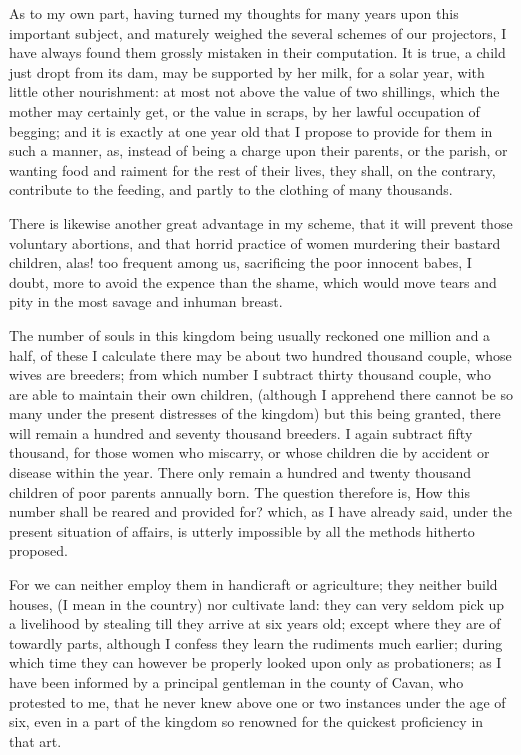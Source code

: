 As to my own part, having turned my thoughts for many years upon this important subject, and maturely weighed the several schemes of our projectors, I have always found them grossly mistaken in their computation. It is true, a child just dropt from its dam, may be supported by her milk, for a solar year, with little other nourishment: at most not above the value of two shillings, which the mother may certainly get, or the value in scraps, by her lawful occupation of begging; and it is exactly at one year old that I propose to provide for them in such a manner, as, instead of being a charge upon their parents, or the parish, or wanting food and raiment for the rest of their lives, they shall, on the contrary, contribute to the feeding, and partly to the clothing of many thousands.\par

There is likewise another great advantage in my scheme, that it will prevent those voluntary abortions, and that horrid practice of women murdering their bastard children, alas! too frequent among us, sacrificing the poor innocent babes, I doubt, more to avoid the expence than the shame, which would move tears and pity in the most savage and inhuman breast.\par

The number of souls in this kingdom being usually reckoned one million and a half, of these I calculate there may be about two hundred thousand couple, whose wives are breeders; from which number I subtract thirty thousand couple, who are able to maintain their own children, (although I apprehend there cannot be so many under the present distresses of the kingdom) but this being granted, there will remain a hundred and seventy thousand breeders. I again subtract fifty thousand, for those women who miscarry, or whose children die by accident or disease within the year. There only remain a hundred and twenty thousand children of poor parents annually born. The question therefore is, How this number shall be reared and provided for? which, as I have already said, under the present situation of affairs, is utterly impossible by all the methods hitherto proposed.\par

For we can neither employ them in handicraft or agriculture; they neither build houses, (I mean in the country) nor cultivate land: they can very seldom pick up a livelihood by stealing till they arrive at six years old; except where they are of towardly parts, although I confess they learn the rudiments much earlier; during which time they can however be properly looked upon only as probationers; as I have been informed by a principal gentleman in the county of Cavan, who protested to me, that he never knew above one or two instances under the age of six, even in a part of the kingdom so renowned for the quickest proficiency in that art.\par

